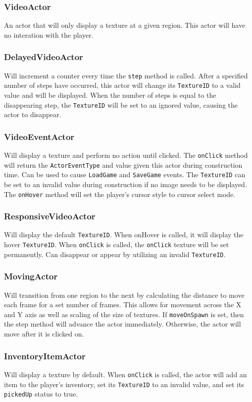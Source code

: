 \documentclass{article}
\begin{document}
    \subsubsection{VideoActor}
    An actor that will only display a texture at a given region. This actor will have no interation with the player.
    \subsubsection{DelayedVideoActor}
    Will increment a counter every time the \texttt{step} method is called. After a specified number of steps have occurred, this actor will change its \texttt{TextureID} to a valid value and will be displayed. When the number of steps is equal to the disappearing step, the \texttt{TextureID} will be set to an ignored value, causing the actor to disappear.
    \subsubsection{VideoEventActor}
    Will display a texture and perform no action until clicked. The \texttt{onClick} method will return the \texttt{ActorEventType} and value given this actor during construction time. Can be used to cause \texttt{LoadGame} and \texttt{SaveGame} events. The \texttt{TextureID} can be set to an invalid value during construction if no image needs to be displayed. The \texttt{onHover} method will set the player's cursor style to cursor select mode.
    \subsubsection{ResponsiveVideoActor}
    Will display the default \texttt{TextureID}. When onHover is called, it will display the hover \texttt{TextureID}. When \texttt{onClick} is called, the \texttt{onClick} texture will be set permanently. Can disappear or appear by utilizing an invalid \texttt{TextureID}.
    \subsubsection{MovingActor}
    Will transition from one region to the next by calculating the distance to move each frame for a set number of frames. This allows for movement across the X and Y axis as well as scaling of the size of textures. If \texttt{moveOnSpawn} is set, then the step method will advance the actor immediately. Otherwise, the actor will move after it is clicked on.
    \subsubsection{InventoryItemActor}
    Will display a texture by default. When \texttt{onClick} is called, the actor will add an item to the player's inventory, set its \texttt{TextureID} to an invalid value, and set its \texttt{pickedUp} status to true.
\end{document}

